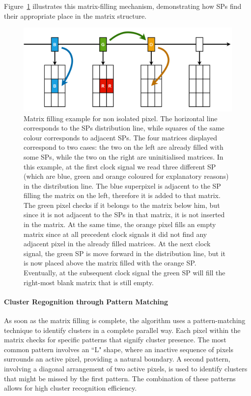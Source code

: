Figure~\ref{fig:matrix_filling_clustering} illustrates this matrix-filling mechanism, demonstrating how SPs find their appropriate place in the matrix structure.

\begin{figure}
    \centering
    \includegraphics[width=\textwidth]{figures/matrix_filling_clustering.png}
    \caption{Matrix filling example for non isolated pixel. The horizontal line corresponds to the SPs distribution line, while squares of the same colour corresponds to adjacent SPs. The four matrices displayed correspond to two cases: the two on the left are already filled with some SPs, while the two on the right are uninitialised matrices. In this example, at the first clock signal we read three different SP (which are blue, green and orange coloured for explanatory reasons) in the distribution line. The blue superpixel is adjacent to the SP filling the matrix on the left, therefore it is added to that matrix. The green pixel checks if it belongs to the matrix below him, but since it is not adjacent to the SPs in that matrix, it is not inserted in the matrix. At the same time, the orange pixel fills an empty matrix since at all precedent clock signals it did not find any adjacent pixel in the already filled matrices. At the next clock signal, the green SP is move forward in the distribution line, but it is now placed above the matrix filled with the orange SP. Eventually, at the subsequent clock signal the green SP will fill the right-most blank matrix that is still empty.}
    \label{fig:matrix_filling_clustering}
\end{figure}

\paragraph{Cluster Regognition through Pattern Matching}
As soon as the matrix filling is complete, the algorithm uses a pattern-matching technique to identify clusters in a complete parallel way. Each pixel within the matrix checks for specific patterns that signify cluster presence. The most common pattern involves an ``L" shape, where an inactive sequence of pixels surrounds an active pixel, providing a natural boundary. A second pattern, involving a diagonal arrangement of two active pixels, is used to identify clusters that might be missed by the first pattern. The combination of these patterns allows for high cluster recognition efficiency.

